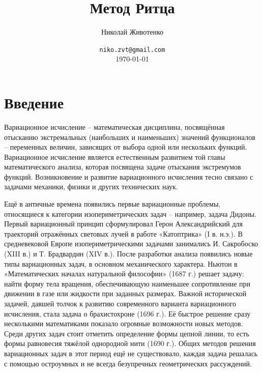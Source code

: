 \documentclass{article}
\title{Метод Ритца} %
\author[1]{Николай Животенко} %
\date{\texttt{niko.zvt@gmail.com} \\ \small \today } %
\affil[1]{\small M.Sc., каф. Ракетно-космических композитных конструкций, МГТУ им. Н. Э. Баумана}
\affil[1]{\small B.Sc., каф. Физики твёрдого тела, Воронежский Государственный Технический Университет}
\begin{document}
\maketitle %


\section*{Введение} %

\begin{info} %
	Вариационное исчисление – математическая дисциплина, посвящённая отысканию экстремальных (наибольших и наименьших) значений функционалов – переменных величин, зависящих от выбора одной или нескольких функций. Вариационное исчисление является естественным развитием той главы математического анализа, которая посвящена задаче отыскания экстремумов функций. Возникновение и развитие вариационного исчисления тесно связано с задачами механики, физики и других технических наук.
\end{info}

Ещё в античные времена появились первые вариационные проблемы, относящиеся к категории изопериметрических задач – например, задача Дидоны. Первый вариационный принцип сформулировал Герон Александрийский для траекторий отражённых световых лучей в работе «Катоптрика» (I в. н.э.). В средневековой Европе изопериметрическими задачами занимались И. Сакробоско (XIII в.) и Т. Брадвардин (XIV в.). После разработки анализа появились новые типы вариационных задач, в основном механического характера. Ньютон в «Математических началах натуральной философии» (1687 г.) решает задачу: найти форму тела вращения, обеспечивающую наименьшее сопротивление при движении в газе или жидкости при заданных размерах. Важной исторической задачей, давшей толчок к развитию современного варианта вариационного исчисления, стала задача о брахистохроне (1696 г.). Её быстрое решение сразу несколькими математиками показало огромные возможности новых методов. Среди других задач стоит отметить определение формы цепной линии, то есть формы равновесия тяжёлой однородной нити (1690 г.). Общих методов решения вариационных задач в этот период ещё не существовало, каждая задача решалась с помощью остроумных и не всегда безупречных геометрических рассуждений.
\end{document}
